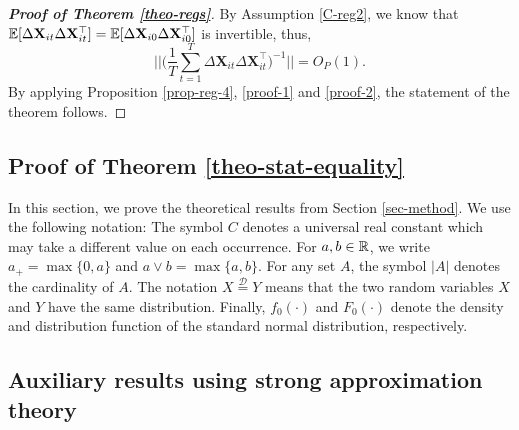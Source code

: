 \begin{proof}[\textnormal{\textbf{Proof of Theorem \ref{theo-regs}}}]
By Assumption \ref{C-reg2}, we know that $\mathbb{E} [\Delta \mathbf{X}_{it} \Delta \mathbf{X}_{it}^\top] = \mathbb{E} [\Delta \mathbf{X}_{i0} \Delta \mathbf{X}_{i0}^\top]$ is invertible, thus, 
\[\Bigg| \Bigg| \Big(\frac{1}{T}\sum_{t=1}^T\Delta \mathbf{X}_{it} \Delta \mathbf{X}_{it}^\top\Big)^{-1}\Bigg|\Bigg| = O_P(1).\]
By applying Proposition \ref{prop-reg-4}, \eqref{proof-1} and \eqref{proof-2}, the statement of the theorem follows.
\end{proof}

\subsection{Proof of Theorem \ref{theo-stat-equality}}\label{subsec-appendix-stat-equaility}


In this section, we prove the theoretical results from Section \ref{sec-method}. We use the following notation: The symbol $C$ denotes a universal real constant which may take a different value on each occurrence. For $a,b \in \mathbb{R}$, we write $a_+ = \max \{0,a\}$ and $a \vee b = \max\{a,b\}$. For any set $A$, the symbol $|A|$ denotes the cardinality of $A$. The notation $X \stackrel{\mathcal{D}}{=} Y$ means that the two random variables $X$ and $Y$ have the same distribution. Finally, $f_0(\cdot)$ and $F_0(\cdot)$ denote the density and distribution function of the standard normal distribution, respectively.



\subsection*{Auxiliary results using strong approximation theory}


